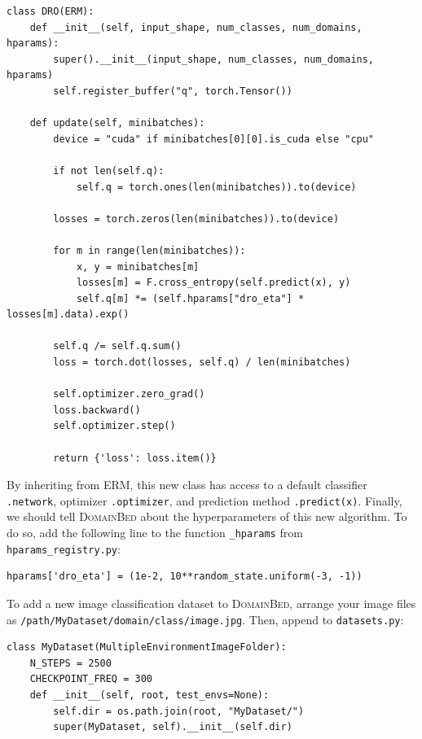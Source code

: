 \documentclass{article}
\newcommand{\domainbed}{\textsc{DomainBed}\xspace}
\begin{document}
\newsavebox{\lsta}
\begin{lrbox}{\lsta}
\begin{lstlisting}
class DRO(ERM):
    def __init__(self, input_shape, num_classes, num_domains, hparams):
        super().__init__(input_shape, num_classes, num_domains, hparams)
        self.register_buffer("q", torch.Tensor())

    def update(self, minibatches):
        device = "cuda" if minibatches[0][0].is_cuda else "cpu"

        if not len(self.q):
            self.q = torch.ones(len(minibatches)).to(device)

        losses = torch.zeros(len(minibatches)).to(device)

        for m in range(len(minibatches)):
            x, y = minibatches[m]
            losses[m] = F.cross_entropy(self.predict(x), y)
            self.q[m] *= (self.hparams["dro_eta"] * losses[m].data).exp()

        self.q /= self.q.sum()
        loss = torch.dot(losses, self.q) / len(minibatches)

        self.optimizer.zero_grad()
        loss.backward()
        self.optimizer.step()

        return {'loss': loss.item()}
\end{lstlisting}
\end{lrbox}

\scalebox{0.75}{\usebox{\lsta}}

By inheriting from ERM, this new class has access to a default classifier \texttt{.network}, optimizer \texttt{.optimizer}, and prediction method \texttt{.predict(x)}.
%
Finally, we should tell \domainbed about the hyperparameters of this new algorithm. To do so, add the following line to the function \texttt{\_hparams} from \texttt{hparams\_registry.py}:


\newsavebox{\lstc}
\begin{lrbox}{\lstc}
\begin{lstlisting}
hparams['dro_eta'] = (1e-2, 10**random_state.uniform(-3, -1))
\end{lstlisting}
\end{lrbox}

\scalebox{0.75}{\usebox{\lstc}}


To add a new image classification dataset to \domainbed, arrange your image files as \texttt{/path/MyDataset/domain/class/image.jpg}.
%
Then, append to \texttt{datasets.py}:

\newsavebox{\lstb}
\begin{lrbox}{\lstb}
\begin{lstlisting}
class MyDataset(MultipleEnvironmentImageFolder):
    N_STEPS = 2500
    CHECKPOINT_FREQ = 300
    def __init__(self, root, test_envs=None):
        self.dir = os.path.join(root, "MyDataset/")
        super(MyDataset, self).__init__(self.dir)
\end{lstlisting}
\end{lrbox}
\end{document}
